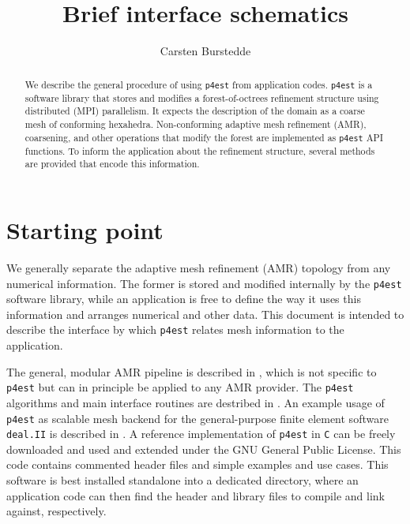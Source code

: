 \documentclass[letterpaper,11pt]{article}
\author{Carsten Burstedde}
\title{Brief \pforest interface schematics}
\newcommand{\dealii}{\texttt{deal.II}\xspace}
\newcommand{\pforest}{\texttt{p4est}\xspace}
\begin{document}
\maketitle

\begin{abstract}
We describe the general procedure of using \pforest from application codes.
\pforest is a software library that stores and modifies a forest-of-octrees
refinement structure using distributed (MPI) parallelism.  It expects the
description of the domain as a coarse mesh of conforming hexahedra.
Non-conforming adaptive mesh refinement (AMR), coarsening, and other operations
that modify the forest are implemented as \pforest API functions.  To inform
the application about the refinement structure, several methods are provided
that encode this information.
\end{abstract}

\section{Starting point}

We generally separate the adaptive mesh refinement (AMR) topology from any
numerical information.  The former is stored and modified internally by the
\pforest software library, while an application is free to define the way it
uses this information and arranges numerical and other data.  This document is
intended to describe the interface by which \pforest relates mesh information
to the application.

The general, modular AMR pipeline is described in
\cite{BursteddeGhattasStadlerEtAl08}, which is not specific to \pforest but can
in principle be applied to any AMR provider.  The \pforest algorithms and main
interface routines are destribed in \cite{BursteddeWilcoxGhattas11}.
An example usage of \pforest as scalable mesh backend for the general-purpose
finite element software \dealii is described in
\cite{BangerthBursteddeHeisterEtAl11}.  A reference implementation of \pforest
in \texttt{C} can be freely downloaded \cite{Burstedde10} and used and extended
under the GNU General Public License.  This code contains commented header
files and simple examples and use cases.  This software is best installed
standalone into a dedicated directory, where an application code can then find
the header and library files to compile and link against, respectively.
\end{document}

